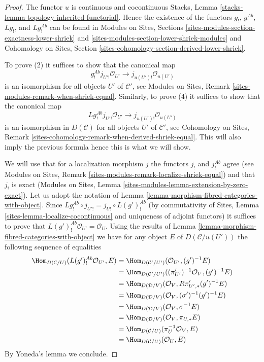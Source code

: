 \begin{proof}
The functor $u$ is continuous and cocontinuous
Stacks, Lemma \ref{stacks-lemma-topology-inherited-functorial}.
Hence the existence of the functors $g_!$, $g_!^{\textit{Ab}}$,
$Lg_!$, and $Lg_!^{\textit{Ab}}$ can be found in
Modules on Sites, Sections
\ref{sites-modules-section-exactness-lower-shriek} and
\ref{sites-modules-section-lower-shriek-modules}
and
Cohomology on Sites, Section
\ref{sites-cohomology-section-derived-lower-shriek}.

\medskip\noindent
To prove (2) it suffices to show that the canonical map
$$
g_!^{\textit{Ab}}j_{U'!}\mathcal{O}_{U'} \to j_{u(U')!}\mathcal{O}_{u(U')}
$$
is an isomorphism for all objects $U'$ of $\mathcal{C}'$, see
Modules on Sites, Remark \ref{sites-modules-remark-when-shriek-equal}.
Similarly, to prove (4) it suffices to show that the canonical map
$$
Lg_!^{\textit{Ab}}j_{U'!}\mathcal{O}_{U'} \to j_{u(U')!}\mathcal{O}_{u(U')}
$$
is an isomorphism in $D(\mathcal{C})$ for all objects $U'$ of
$\mathcal{C}'$, see Cohomology on Sites, Remark
\ref{sites-cohomology-remark-when-derived-shriek-equal}.
This will also imply the previous formula hence this is what we will show.

\medskip\noindent
We will use that for a localization morphism $j$ the
functors $j_!$ and $j_!^{\textit{Ab}}$ agree (see
Modules on Sites, Remark \ref{sites-modules-remark-localize-shriek-equal})
and that $j_!$ is exact
(Modules on Sites, Lemma \ref{sites-modules-lemma-extension-by-zero-exact}).
Let us adopt the notation of
Lemma \ref{lemma-morphism-fibred-categories-with-object}.
Since $Lg_!^{\textit{Ab}} \circ j_{U'!} = j_{U!} \circ L(g')^{\textit{Ab}}_!$
(by commutativity of Sites, Lemma \ref{sites-lemma-localize-cocontinuous}
and uniqueness of adjoint functors) it suffices to prove that
$L(g')^{\textit{Ab}}_!\mathcal{O}_{U'} = \mathcal{O}_U$. Using the
results of
Lemma \ref{lemma-morphism-fibred-categories-with-object}
we have for any object $E$ of $D(\mathcal{C}/u(U'))$ the following
sequence of equalities
\begin{align*}
\Hom_{D(\mathcal{C}/U)}(L(g')_!^{\textit{Ab}}\mathcal{O}_{U'}, E)
& =
\Hom_{D(\mathcal{C}'/U')}(\mathcal{O}_{U'}, (g')^{-1}E) \\
& =
\Hom_{D(\mathcal{C}'/U')}((\pi'_{U'})^{-1}\mathcal{O}_V, (g')^{-1}E) \\
& =
\Hom_{D(\mathcal{D}/V)}(\mathcal{O}_V, R\pi'_{U', *}(g')^{-1}E) \\
& =
\Hom_{D(\mathcal{D}/V)}(\mathcal{O}_V, (\sigma')^{-1}(g')^{-1}E) \\
& =
\Hom_{D(\mathcal{D}/V)}(\mathcal{O}_V, \sigma^{-1}E) \\
& =
\Hom_{D(\mathcal{D}/V)}(\mathcal{O}_V, \pi_{U, *}E) \\
& =
\Hom_{D(\mathcal{C}/U)}(\pi_U^{-1}\mathcal{O}_V, E) \\
& =
\Hom_{D(\mathcal{C}/U)}(\mathcal{O}_U, E)
\end{align*}
By Yoneda's lemma we conclude.
\end{proof}

